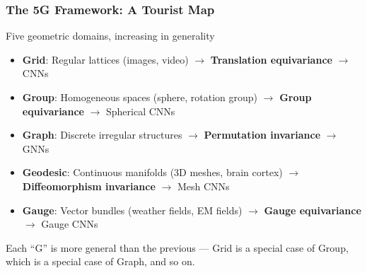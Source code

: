\begin{frame}[fragile]\frametitle{The 5G Framework: A Tourist Map}

\begin{block}{Five geometric domains, increasing in generality}
\begin{itemize}
  \item \textbf{Grid}: Regular lattices (images, video) $\rightarrow$ \textbf{Translation equivariance} $\rightarrow$ CNNs
  \item \textbf{Group}: Homogeneous spaces (sphere, rotation group) $\rightarrow$ \textbf{Group equivariance} $\rightarrow$ Spherical CNNs
  \item \textbf{Graph}: Discrete irregular structures $\rightarrow$ \textbf{Permutation invariance} $\rightarrow$ GNNs
  \item \textbf{Geodesic}: Continuous manifolds (3D meshes, brain cortex) $\rightarrow$ \textbf{Diffeomorphism invariance} $\rightarrow$ Mesh CNNs
  \item \textbf{Gauge}: Vector bundles (weather fields, EM fields) $\rightarrow$ \textbf{Gauge equivariance} $\rightarrow$ Gauge CNNs
\end{itemize}
\end{block}

\vspace{0.2cm}
Each ``G'' is more general than the previous --- Grid is a special case of Group, which is a special case of Graph, and so on.

\end{frame}

